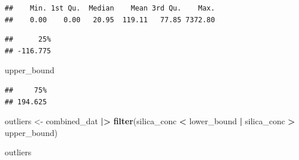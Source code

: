 \documentclass[
]{article}
\newenvironment{Shaded}{\begin{snugshade}}{\end{snugshade}}
\newcommand{\AttributeTok}[1]{\textcolor[rgb]{0.13,0.29,0.53}{#1}}
\newcommand{\ConstantTok}[1]{\textcolor[rgb]{0.56,0.35,0.01}{#1}}
\newcommand{\FloatTok}[1]{\textcolor[rgb]{0.00,0.00,0.81}{#1}}
\newcommand{\FunctionTok}[1]{\textcolor[rgb]{0.13,0.29,0.53}{\textbf{#1}}}
\newcommand{\NormalTok}[1]{#1}
\newcommand{\OtherTok}[1]{\textcolor[rgb]{0.56,0.35,0.01}{#1}}
\newcommand{\SpecialCharTok}[1]{\textcolor[rgb]{0.81,0.36,0.00}{\textbf{#1}}}
\begin{document}
\begin{verbatim}
##    Min. 1st Qu.  Median    Mean 3rd Qu.    Max. 
##    0.00    0.00   20.95  119.11   77.85 7372.80
\end{verbatim}

\begin{Shaded}
\end{Shaded}

\begin{verbatim}
##      25% 
## -116.775
\end{verbatim}

\begin{Shaded}
\begin{Highlighting}[]
\NormalTok{upper\_bound }
\end{Highlighting}
\end{Shaded}

\begin{verbatim}
##     75% 
## 194.625
\end{verbatim}

\begin{Shaded}
\begin{Highlighting}[]
\NormalTok{outliers }\OtherTok{\textless{}{-}}\NormalTok{ combined\_dat }\SpecialCharTok{|\textgreater{}} 
  \FunctionTok{filter}\NormalTok{(silica\_conc }\SpecialCharTok{\textless{}}\NormalTok{ lower\_bound }\SpecialCharTok{|}\NormalTok{ silica\_conc }\SpecialCharTok{\textgreater{}}\NormalTok{ upper\_bound)}

\NormalTok{outliers }
\end{Highlighting}
\end{Shaded}
\end{document}
